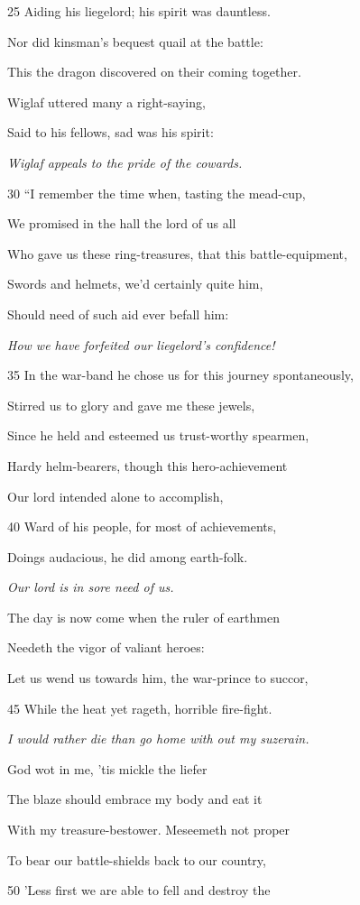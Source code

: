 25
Aiding his liegelord; his spirit was dauntless.

Nor did kinsman’s bequest quail at the battle:

This the dragon discovered on their coming together.

Wiglaf uttered many a right-saying,

Said to his fellows, sad was his spirit:

\emph{Wiglaf appeals to
the pride of the
cowards.}

30
“I remember the time when, tasting the mead-cup,

We promised in the hall the lord of us all

Who gave us these ring-treasures, that this battle-equipment,

Swords and helmets, we’d certainly quite him,

Should need of such aid ever befall him:

\emph{How we have forfeited
our liegelord’s confidence!}

35
In the war-band he chose us for this journey spontaneously,

Stirred us to glory and gave me these jewels,

Since he held and esteemed us trust-worthy spearmen,

Hardy helm-bearers, though this hero-achievement

Our lord intended alone to accomplish,

40
Ward of his people, for most of achievements,

Doings audacious, he did among earth-folk.

\emph{Our lord is in sore
need of us.}

The day is now come when the ruler of earthmen

Needeth the vigor of valiant heroes:

Let us wend us towards him, the war-prince to succor,

45
While the heat yet rageth, horrible fire-fight.

\emph{I would rather die
than go home with
out my suzerain.}

God wot in me, ’tis mickle the liefer

The blaze should embrace my body and eat it

With my treasure-bestower. Meseemeth not proper

To bear our battle-shields back to our country,

50
’Less first we are able to fell and destroy the

